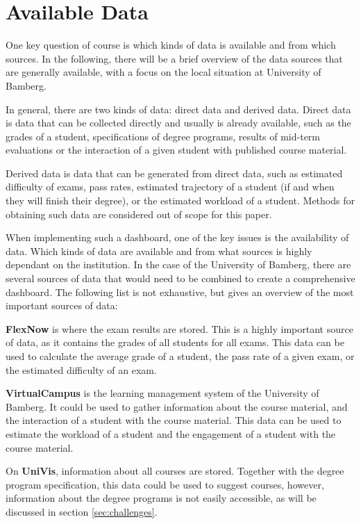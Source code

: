 \section{Available Data}
\label{sec:data}

One key question of course is which kinds of data is available and from which sources. In the following, there will be a brief overview of the data sources that are generally available, with a focus on the local situation at University of Bamberg.

In general, there are two kinds of data: direct data and derived data. Direct data is data that can be collected directly and usually is already available, such as the grades of a student, specifications of degree programs, results of mid-term evaluations or the interaction of a given student with published course material.

Derived data is data that can be generated from direct data, such as estimated difficulty of exams, pass rates, estimated trajectory of a student (if and when they will finish their degree), or the estimated workload of a student. Methods for obtaining such data are considered out of scope for this paper.

When implementing such a dashboard, one of the key issues is the availability of data. Which kinds of data are available and from what sources is highly dependant on the institution. In the case of the University of Bamberg, there are several sources of data that would need to be combined to create a comprehensive dashboard. The following list is not exhaustive, but gives an overview of the most important sources of data:

\textbf{FlexNow} is where the exam results are stored. This is a highly important source of data, as it contains the grades of all students for all exams. This data can be used to calculate the average grade of a student, the pass rate of a given exam, or the estimated difficulty of an exam.

\textbf{VirtualCampus} is the learning management system of the University of Bamberg. It could be used to gather information about the course material, and the interaction of a student with the course material. This data can be used to estimate the workload of a student and the engagement of a student with the course material.

On \textbf{UniVis}, information about all courses are stored. Together with the degree program specification, this data could be used to suggest courses, however, information about the degree programs is not easily accessible, as will be discussed in section \ref{sec:challenges}.